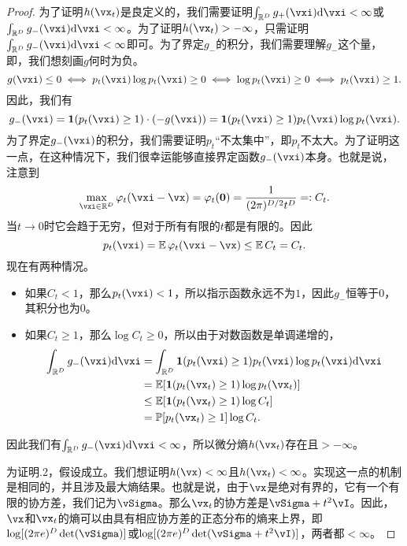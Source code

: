 \documentclass[../../book-main.tex]{subfiles}
\begin{document}
\begin{proof}
    为了证明\(h(\vx_{t})\)是良定义的，我们需要证明\(\int_{\R^{D}}g_{+}(\vxi)\odif{\vxi} < \infty\)或\(\int_{\R^{D}}g_{-}(\vxi) \odif{\vxi} < \infty\)。为了证明\(h(\vx_{t}) > -\infty\)，只需证明\(\int_{\R^{D}}g_{-}(\vxi)\odif{\vxi} < \infty\)即可。为了界定\(g_{-}\)的积分，我们需要理解\(g_{-}\)这个量，即，我们想刻画\(g\)何时为负。
    \begin{equation}
        g(\vxi) \leq 0 \iff p_{t}(\vxi)\log p_{t}(\vxi) \geq 0 \iff \log p_{t}(\vxi) \geq 0 \iff p_{t}(\vxi) \geq 1.
    \end{equation}
    因此，我们有
    \begin{equation}
        g_{-}(\vxi) = \indvar(p_{t}(\vxi) \geq 1)\cdot (-g(\vxi)) = \indvar(p_{t}(\vxi) \geq 1)p_{t}(\vxi)\log p_{t}(\vxi).
    \end{equation}
    为了界定\(g_{-}(\vxi)\)的积分，我们需要证明\(p_{t}\)“不太集中”，即\(p_{t}\)不太大。为了证明这一点，在这种情况下，我们很幸运能够直接界定函数\(g_{-}(\vxi)\)本身。也就是说，注意到
    \begin{equation}
        \max_{\vxi \in \R^{D}}\phi_{t}(\vxi - \vx) = \phi_{t}(\vzero) = \frac{1}{(2\pi)^{D/2}t^{D}} =: C_{t}.
    \end{equation}
    当\(t \to 0\)时它会趋于无穷，但对于所有有限的\(t\)都是有限的。因此
    \begin{equation}
        p_{t}(\vxi) = \Ex \phi_{t}(\vxi - \vx) \leq \Ex C_{t} = C_{t}.
    \end{equation}
    现在有两种情况。
    \begin{itemize}
        \item 如果\(C_{t} < 1\)，那么\(p_{t}(\vxi) < 1\)，所以指示函数永远不为\(1\)，因此\(g_{-}\)恒等于\(0\)，其积分也为\(0\)。
        \item 如果\(C_{t} \geq 1\)，那么\(\log C_{t} \geq 0\)，所以由于对数函数是单调递增的，
        \begin{align}
            \int_{\R^{D}}g_{-}(\vxi)\odif{\vxi}
            &= \int_{\R^{D}}\indvar(p_{t}(\vxi) \geq 1)p_{t}(\vxi)\log p_{t}(\vxi)\odif{\vxi}  \\ 
            &= \Ex[\indvar(p_{t}(\vx_{t}) \geq 1)\log p_{t}(\vx_{t})]  \\ 
            &\leq \Ex[\indvar(p_{t}(\vx_{t}) \geq 1) \log C_{t}] \\ 
            &= \Pr[p_{t}(\vx_{t}) \geq 1]\log C_{t}.
        \end{align}
    \end{itemize}
    因此我们有\(\int_{\R^{D}}g_{-}(\vxi)\odif{\vxi} < \infty\)，所以微分熵\(h(\vx_{t})\)存在且\(> -\infty\)。

    为证明.2，假设成立。我们想证明\(h(\vx) < \infty\)且\(h(\vx_{t}) < \infty\)。实现这一点的机制是相同的，并且涉及最大熵结果。也就是说，由于\(\vx\)是绝对有界的，它有一个有限的协方差，我们记为\(\vSigma\)。那么\(\vx_{t}\)的协方差是\(\vSigma + t^{2}\vI\)。因此，\(\vx\)和\(\vx_{t}\)的熵可以由具有相应协方差的正态分布的熵来上界，即\(\log[(2\pi e)^{D}\det(\vSigma)]\)或\(\log[(2\pi e)^{D}\det(\vSigma + t^{2}\vI)]\)，两者都\(< \infty\)。
\end{proof}
\end{document}
